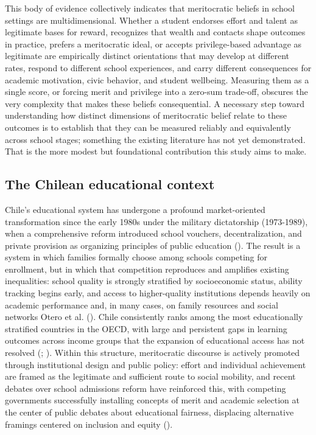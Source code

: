 \documentclass[
  13pt,
]{article}
\begin{document}
This body of evidence collectively indicates that meritocratic beliefs
in school settings are multidimensional. Whether a student endorses
effort and talent as legitimate bases for reward, recognizes that wealth
and contacts shape outcomes in practice, prefers a meritocratic ideal,
or accepts privilege-based advantage as legitimate are empirically
distinct orientations that may develop at different rates, respond to
different school experiences, and carry different consequences for
academic motivation, civic behavior, and student wellbeing. Measuring
them as a single score, or forcing merit and privilege into a zero-sum
trade-off, obscures the very complexity that makes these beliefs
consequential. A necessary step toward understanding how distinct
dimensions of meritocratic belief relate to these outcomes is to
establish that they can be measured reliably and equivalently across
school stages; something the existing literature has not yet
demonstrated. That is the more modest but foundational contribution this
study aims to make.

\subsection{The Chilean educational
context}\label{the-chilean-educational-context}

Chile's educational system has undergone a profound market-oriented
transformation since the early 1980s under the military dictatorship
(1973-1989), when a comprehensive reform introduced school vouchers,
decentralization, and private provision as organizing principles of
public education
().
The result is a system in which families formally choose among schools
competing for enrollment, but in which that competition reproduces and
amplifies existing inequalities: school quality is strongly stratified
by socioeconomic status, ability tracking begins early, and access to
higher-quality institutions depends heavily on academic performance and,
in many cases, on family resources and social networks Otero et al.
(). Chile consistently
ranks among the most educationally stratified countries in the OECD,
with large and persistent gaps in learning outcomes across income groups
that the expansion of educational access has not resolved
(;
). Within this structure,
meritocratic discourse is actively promoted through institutional design
and public policy: effort and individual achievement are framed as the
legitimate and sufficient route to social mobility, and recent debates
over school admissions reform have reinforced this, with competing
governments successfully installing concepts of merit and academic
selection at the center of public debates about educational fairness,
displacing alternative framings centered on inclusion and equity
().
\end{document}
